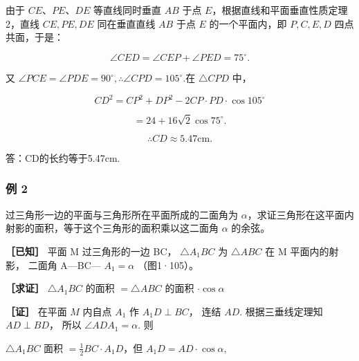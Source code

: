 由于 \(CE\)、\(PE\)、\(DE\) 等直线同时垂直 \(AB\) 于点
\(E\)，根据直线和平面垂直性质定理2，直线 \(CE, PE, DE\) 同在垂直直线
\(AB\) 于点 \(E\) 的一个平面内，即 \(P, C, E, D\) 四点共面，于是：

\[
\angle C E D = \angle C E P + \angle P E D = 75 ^ {\circ}.
\]

又
\(\angle PCE = \angle PDE = 90^{\circ},\therefore \angle CPD = 105^{\circ}.\)在
\(\triangle CPD\) 中，

\[
C D ^ {2} = C P ^ {2} + D P ^ {2} - 2 C P \cdot P D \cdot \cos 105 ^ {\circ}
\]

\[
= 24 + 16 \sqrt {2} \cos 75 ^ {\circ}.
\]

\[
\therefore C D \approx 5.47 \mathrm{cm}.
\]

答：CD的长约等于5.47cm.

\subsubsection{例 2}

过三角形一边的平面与三角形所在平面所成的二面角为
\(\alpha\)，求证三角形在这平面内射影的面积，等于这个三角形的面积乘以这二面角
\(\alpha\) 的余弦。

\textbf{［已知］} 平面 M 过三角形的一边 BC， \(\triangle A_{1}BC\) 为
\(\triangle ABC\) 在 M 平面内的射影， 二面角 A---BC--- \(A_{1}=\alpha\)
（图1·105）。

\textbf{［求证］} \(\triangle A_{1}BC\) 的面积 \(= \triangle ABC\)
的面积 \(\cdot \cos \alpha\)

\textbf{［证］} 在平面 \(M\) 内自点 \(A_{1}\) 作 \(A_{1}D \perp BC\)，
连结 \(AD\). 根据三垂线定理知 \(AD \perp BD\)， 所以
\(\angle ADA_{1} = \alpha\). 则

\(\triangle A_{1}BC\) 面积 \(= \frac{1}{2} BC\cdot A_{1}D\)，但
\(A_{1}D = AD\cdot \cos \alpha ,\)

